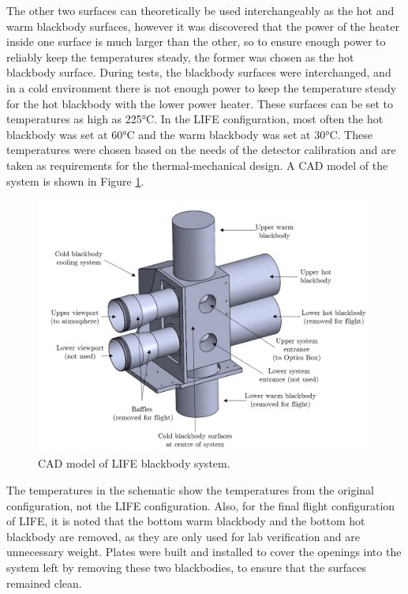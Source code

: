 The other two surfaces can theoretically be used interchangeably as the hot and warm blackbody surfaces, however it was discovered that the power of the heater inside one surface is much larger than the other, so to ensure enough power to reliably keep the temperatures steady, the former was chosen as the hot blackbody surface. During tests, the blackbody surfaces were interchanged, and in a cold environment there is not enough power to keep the temperature steady for the hot blackbody with the lower power heater. These surfaces can be set to temperatures as high as 225°C. In the LIFE configuration, most often the hot blackbody was set at 60°C and the warm blackbody was set at 30°C. These temperatures were chosen based on the needs of the detector calibration and are taken as requirements for the thermal-mechanical design. A CAD model of the system is shown in Figure \ref{fig:CAD_Blackbodies}.

\begin{figure}
    \centering
    \includegraphics[width=\linewidth]{chap3_images/Blackbody_CAD_labelled_PNG.png}
    \caption{CAD model of LIFE blackbody system.}
    \label{fig:CAD_Blackbodies}
\end{figure}

The temperatures in the schematic show the temperatures from the original configuration, not the LIFE configuration. Also, for the final flight configuration of LIFE, it is noted that the bottom warm blackbody and the bottom hot blackbody are removed, as they are only used for lab verification and are unnecessary weight. Plates were built and installed to cover the openings into the system left by removing these two blackbodies, to ensure that the surfaces remained clean.

